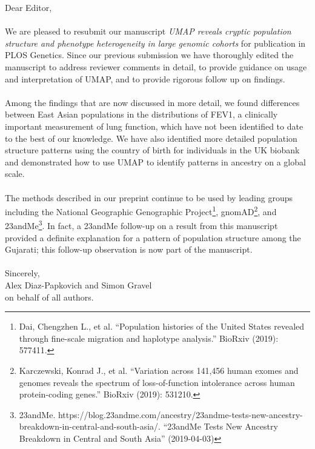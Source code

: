 \documentclass{article}
\begin{document}
Dear Editor,
\\\\
We are pleased to resubmit our manuscript \emph{UMAP reveals cryptic population structure and phenotype heterogeneity in large genomic cohorts} for publication in PLOS Genetics. Since our previous submission we have thoroughly edited the manuscript to address reviewer comments in detail, to provide guidance on usage and interpretation of UMAP, and to provide rigorous follow up on findings.
\\\\
Among the findings that are now discussed in more detail, we found differences between East Asian populations in the distributions of FEV1, a clinically important measurement of lung function, which have not been identified to date to the best of our knowledge. We have also identified more detailed population structure patterns using the country of birth for individuals in the UK biobank and demonstrated how to use UMAP to identify patterns in ancestry on a global scale.
\\\\
The methods described in our preprint continue to be used by leading groups including the National Geographic Genographic Project\footnote{Dai, Chengzhen L., et al. ``Population histories of the United States revealed through fine-scale migration and haplotype analysis.'' BioRxiv (2019): 577411.}, gnomAD\footnote{Karczewski, Konrad J., et al. ``Variation across 141,456 human exomes and genomes reveals the spectrum of loss-of-function intolerance across human protein-coding genes.'' BioRxiv (2019): 531210.}, and 23andMe\footnote{23andMe. https://blog.23andme.com/ancestry/23andme-tests-new-ancestry-breakdown-in-central-and-south-asia/. ``23andMe Tests New Ancestry Breakdown in Central and South Asia'' (2019-04-03)}. In fact, a 23andMe follow-up on a result from this manuscript provided a definite explanation for a pattern of population structure among the Gujarati; this follow-up observation is now part of the manuscript.  
\\\\
Sincerely,
\\
Alex Diaz-Papkovich and Simon Gravel
\\
on behalf of all authors.
\end{document}
